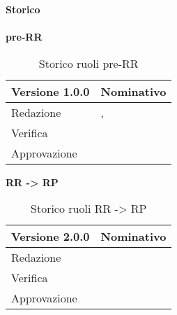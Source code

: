 \newpage
\Large{\textbf{Storico }}\\
\normalsize \\

\textbf{pre-RR}
\label{tabVers1}
\begin{table}[h]
	\begin{tabular}{p{} p{}}
		\toprule \textbf{Versione 1.0.0}	&	\textbf{Nominativo}\\
		\midrule Redazione	& \FM, \PM\\
		\midrule Verifica &	\GP\\
		\midrule Approvazione	& \TP\\
		\bottomrule
	\end{tabular}
	\caption{Storico ruoli pre-RR}
\end{table}

\textbf{RR -> RP}
\label{tabVers2}
\begin{table}[h]
	\begin{tabular}{p{} p{}}
		\toprule \textbf{Versione 2.0.0}	&	\textbf{Nominativo}\\
		\midrule Redazione	& \VG\\
		\midrule Verifica &	\GP\\
		\midrule Approvazione	& \PM\\
		\bottomrule
	\end{tabular}
	\caption{Storico ruoli RR -> RP}
\end{table}